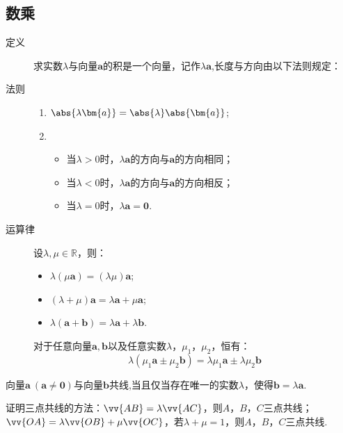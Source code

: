   \subsection{数乘}
    \begin{description}
      \item[定义] 求实数$ \lambda $与向量$\bm{a}$的积是一个向量，记作$\lambda\bm{a}$,长度与方向由以下法则规定：
      \item[法则]
        \begin{enumerate}[label=\arabic*)]
          \item $\abs{\lambda \bm{a}}=\abs{\lambda}\abs{\bm{a}} $;
          \item
            \begin{itemize}
              \item 当$ \lambda>0 $时，$ \lambda\bm{a} $的方向与$\bm{a}$的方向相同；
              \item 当$ \lambda<0 $时，$ \lambda\bm{a} $的方向与$\bm{a}$的方向相反；
              \item 当$ \lambda=0 $时，$ \lambda\bm{a}=\bm 0 $.
            \end{itemize}
        \end{enumerate}
      \item[运算律]
        设$\lambda,\mu\in\mathbb{R}$，则：\par
        \begin{itemize}
            \item $\lambda(\mu\bm{a})=(\lambda\mu)\bm{a}$;
            \item $(\lambda+\mu)\bm{a}=\lambda\bm{a}+\mu\bm{a}$;
            \item $\lambda(\bm{a}+\bm{b})=\lambda\bm{a}+\lambda\bm{b}$.
        \end{itemize}
      对于任意向量$\bm a,\bm b$以及任意实数$\lambda$，$\mu_1$，$\mu_2$，恒有：
      \[\lambda({\mu_1\bm a}\pm{\mu_2\bm b})={\lambda\mu_1\bm a}\pm{\lambda\mu_2\bm b}\]
    \end{description}
    \begin{Theorem}[向量共线定理]
      向量$\bm{a}~(\bm{a}\ne\bm{0})$与向量$\bm{b}$共线,当且仅当存在唯一的实数$ \lambda $，使得$\bm{b}=\lambda\bm{a}$.
    \end{Theorem}
    {\kaishu
     证明三点共线的方法：$\vv{AB}=\lambda\vv{AC}$，则$A$，$B$，$C$三点共线；$\vv{OA}=\lambda\vv{OB}+\mu\vv{OC}$，若$\lambda+\mu=1$，则$A$，$B$，$C$三点共线.
    }
  \clearpage
